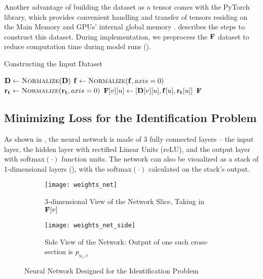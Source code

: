 Another advantage of building the dataset as a tensor comes with the PyTorch library, which provides convenient handling and transfer of tensors residing on the Main Memory and GPUs' internal global memory \cite{PTDocs}.  describes the steps to construct this dataset. During implementation, we preprocess the $\mathbf{F}$ dataset to reduce computation time during model runs ().
\begin{algorithm}[!htbp]
    \caption{Constructing the Input Dataset} \label{alg:Constructing the Input Dataset}
    \begin{algorithmic}[1]
        \State $\matr{D} \gets \Call{Normalize}{\matr{D}}$
        \State $\vect{f} \gets \Call{Normalize}{\mathbf{f}, axis = 0}$
        \State $\vect{r_t} \gets \Call{Normalize}{\vect{r_t}, axis = 0}$
                \State $\mathbf{F}[v][u] \gets [\mathbf{D}[v][u], \mathbf{f}[u], \mathbf{r_t}[u]]$ 
             \EndFor
        \EndFor
        \State \Return $\mathbf{F}$
        \EndFunction
    \end{algorithmic}
\end{algorithm}

\subsection{Minimizing Loss for the Identification Problem} \label{sec:Minimizing Loss for the Identification Problem}
As shown in , the neural network is made of 3 fully connected layers -- the input layer, the hidden layer with rectified Linear Units (reLU), and the output layer with softmax$(\cdot)$ function units. The network can also be visualized as a stack of 1-dimensional layers (), with the softmax$(\cdot)$ calculated on the stack's output.
\begin{figure}[!htbp]
    \centering
    \begin{subfigure}{\textwidth}
        \centering
        \texttt{[image: weights\_net]}
        \caption{3-dimensional View of the Network Slice, Taking in $\mathbf{F}[v]$}
        \label{fig:3-dimensional view of the network slice taking in Fv}
    \end{subfigure}
    \begin{subfigure}{.75\textwidth}
        \centering
        \texttt{[image: weights\_net\_side]}
        \caption{Side View of the Network: Output of one such cross-section is $p_{u_i, v}$}
        \label{fig:Side view of the network}
    \end{subfigure}
    \caption{Neural Network Designed for the Identification Problem}
    \label{fig:Neural network designed for the Identification Problem}
\end{figure}

